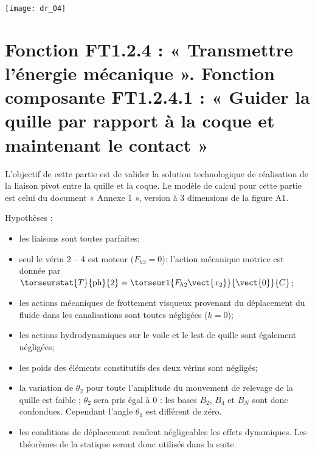 \begin{center}
\texttt{[image: dr\_04]}
\end{center}

\fi

\section{Fonction FT1.2.4 : « Transmettre l'énergie mécanique ». Fonction composante FT1.2.4.1 : « Guider la quille par rapport à la coque et maintenant le contact »}
\ifprof
\else
L’objectif de cette partie est de valider la solution technologique de réalisation de la liaison pivot entre la quille et la coque. 
Le modèle de calcul pour cette partie est celui du document « Annexe 1 », version à 3 dimensions de la figure A1.%

Hypothèses :
\begin{itemize}
\item les liaisons sont toutes parfaites;
\item seul le vérin 2 -- 4 est moteur ($F_{h3}=0$): l’action mécanique motrice est donnée par $\torseurstat{T}{\text{ph}}{2} = \torseurl{F_{h2}\vect{x_2}}{\vect{0}}{C}$;
\item les actions mécaniques de frottement visqueux provenant du déplacement du fluide dans les canalisations sont toutes négligées ($k=0$);
\item les actions hydrodynamiques sur le voile et le lest de quille sont également négligées;
\item les poids des éléments constitutifs des deux vérins sont négligés;
\item la variation de $\theta_2$ pour toute l’amplitude du mouvement de relevage de la quille est faible ; $\theta_2$ sera pris égal à 0 : les bases $B_2$,  $B_4$ et $B_N$ sont donc confondues. Cependant l’angle $\theta_1$ est différent de zéro.
\item les conditions de déplacement rendent négligeables les effets dynamiques. Les théorèmes de la statique seront donc utilisés dans la suite.
\end{itemize}

\fi

\ifprof
\begin{corrige}
\end{corrige}
\else
\fi

